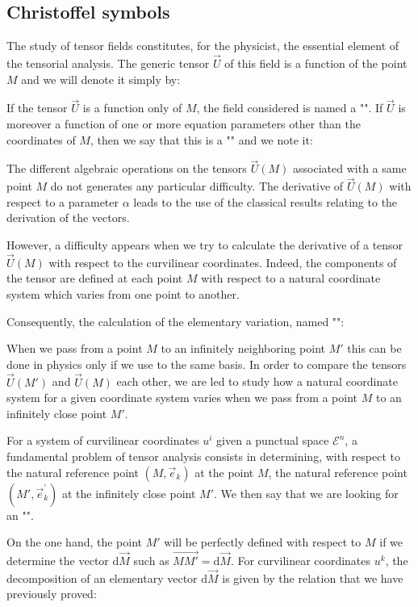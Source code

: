 	
	\pagebreak
	\subsection{Christoffel symbols}
	The study of tensor fields constitutes, for the physicist, the essential element of the tensorial analysis. The generic tensor $\vec{U}$ of this field is a function of the point $M$ and we will denote it simply by:
	
If the tensor $\vec{U}$ is a function only of $M$, the field considered is named a "". If $\vec{U}$ is moreover a function of one or more equation parameters other than the coordinates of $M$, then we say that this is a "" and we note it:
	
	The different algebraic operations on the tensors $\vec{U}(M)$ associated with a same point $M$ do not generates any particular difficulty. The derivative of $\vec{U}(M)$ with respect to a parameter $\alpha$ leads to the use of the classical results relating to the derivation of the vectors.
	
	However, a difficulty appears when we try to calculate the derivative of a tensor $\vec{U}(M)$ with respect to the curvilinear coordinates. Indeed, the components of the tensor are defined at each point $M$ with respect to a natural coordinate system which varies from one point to another.

	Consequently, the calculation of the elementary variation, named "":
	
	When we pass from a point $M$ to an infinitely neighboring point $M'$ this can be done in physics only if we use to the same basis. In order to compare the tensors $\vec{U}(M')$ and $\vec{U}(M)$ each other, we are led to study how a natural coordinate system for a given coordinate system varies when we pass from a point $M$ to an infinitely close point $M'$.
	
	For a system of curvilinear coordinates $u^i$ given a punctual space $\mathcal{E}^n$, a fundamental problem of tensor analysis consists in determining, with respect to the natural reference point $(M,\vec{e}_k)$ at the point $M$, the natural reference point $(M',\vec{e}_k^{\prime})$ at the infinitely close point $M'$. We then say that we are looking for an "".
	
	On the one hand, the point $M'$ will be perfectly defined with respect to $M$ if we determine the vector $\mathrm{d}\vec{M}$ such as $\overrightarrow{MM'}=\mathrm{d}\vec{M}$. For curvilinear coordinates $u^k$, the decomposition of an elementary vector $\mathrm{d}\vec{M}$ is given by the relation that we have previously proved:
	
